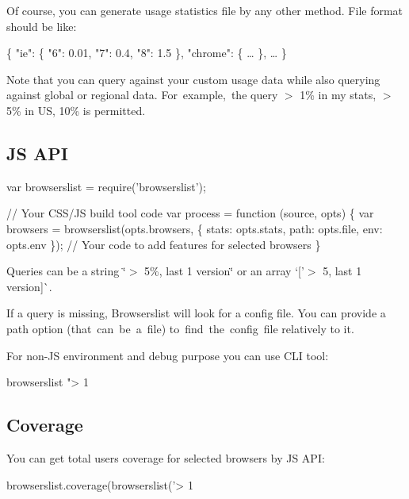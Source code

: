 Of course, you can generate usage statistics file by any other method. File format should be like\+:


\begin{DoxyCode}
\{
  "ie": \{
    "6": 0.01,
    "7": 0.4,
    "8": 1.5
  \},
  "chrome": \{
    …
  \},
  …
\}
\end{DoxyCode}


Note that you can query against your custom usage data while also querying against global or regional data. For example, the query {\ttfamily $>$ 1\% in my stats, $>$ 5\% in US, 10\%} is permitted.

\subsection*{JS A\+PI}


\begin{DoxyCode}
var browserslist = require('browserslist');

// Your CSS/JS build tool code
var process = function (source, opts) \{
    var browsers = browserslist(opts.browsers, \{
        stats: opts.stats,
        path:  opts.file,
        env:   opts.env
    \});
    // Your code to add features for selected browsers
\}
\end{DoxyCode}


Queries can be a string {\ttfamily \char`\"{}$>$ 5\%, last 1 version\char`\"{}} or an array `\mbox{[}'$>$ 5\textquotesingle{}, \textquotesingle{}last 1 version\textquotesingle{}\mbox{]}\`{}.

If a query is missing, Browserslist will look for a config file. You can provide a {\ttfamily path} option (that can be a file) to find the config file relatively to it.

For non-\/\+JS environment and debug purpose you can use C\+LI tool\+:


\begin{DoxyCode}
browserslist "> 1%
\end{DoxyCode}


\subsection*{Coverage}

You can get total users coverage for selected browsers by JS A\+PI\+:


\begin{DoxyCode}
browserslist.coverage(browserslist('> 1%
\end{DoxyCode}



